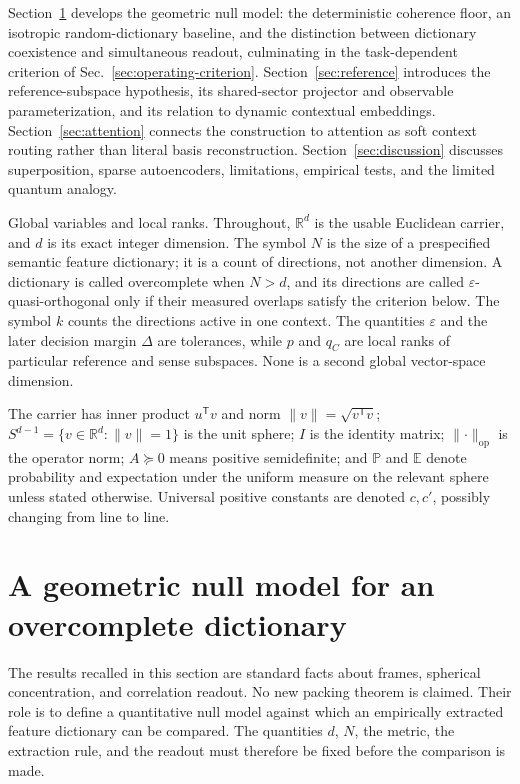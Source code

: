 \documentclass[
  aps,
  reprint,
  superscriptaddress,
  floatfix,
  nofootinbib,
  longbibliography
]{revtex4-2}
\newcommand{\R}{\mathbb{R}}
\newcommand{\E}{\mathbb{E}}
\newcommand{\Prob}{\mathbb{P}}
\newcommand{\Sph}[1]{S^{#1}}
\newcommand{\Nsem}{N}
\newcommand{\T}{^{\mathsf{T}}}
\newcommand{\opnorm}[1]{\lVert #1 \rVert_{\mathrm{op}}}
\newcommand{\norm}[1]{\lVert #1 \rVert}
\begin{document}
Section~\ref{sec:concentration} develops the geometric null model:
the deterministic coherence floor, an isotropic random-dictionary baseline,
and the distinction between dictionary coexistence and simultaneous readout,
culminating in the task-dependent criterion of
Sec.~\ref{sec:operating-criterion}. Section~\ref{sec:reference} introduces the
reference-subspace hypothesis, its shared-sector projector and observable
parameterization, and its relation to dynamic contextual embeddings.
Section~\ref{sec:attention} connects the construction to attention as soft
context routing rather than literal basis reconstruction.
Section~\ref{sec:discussion} discusses superposition, sparse
autoencoders, limitations, empirical tests, and the limited quantum
analogy.

{Global variables and local ranks.}
Throughout, $\R^{d}$ is the usable Euclidean carrier, and $d$ is its exact
integer dimension.  The symbol $\Nsem$ is the size of a prespecified semantic
feature dictionary; it is a count of directions, not another dimension.  A
dictionary is called overcomplete when $\Nsem>d$, and its directions are
called $\varepsilon$-quasi-orthogonal only if their measured overlaps satisfy
the criterion below.  The symbol $k$ counts the directions active in one
context.  The quantities $\varepsilon$ and the later decision margin $\Delta$
are tolerances, while $p$ and $q_C$ are local ranks of particular reference
and sense subspaces.  None is a second global vector-space dimension.

The carrier has inner product $u\T v$
and norm $\norm{v}=\sqrt{v\T v}$; $\Sph{d-1}=\{v\in\R^{d}:\norm{v}=1\}$
is the unit sphere; $I$ is the identity matrix; $\opnorm{\cdot}$ is the
operator norm; $A\succeq0$ means positive semidefinite; and $\Prob$ and
$\E$ denote probability and expectation under the uniform measure on
the relevant sphere unless stated otherwise. Universal positive
constants are denoted $c,c'$, possibly changing from line to line.

\section{A geometric null model for an overcomplete dictionary}
\label{sec:concentration}

The results recalled in this section are standard facts about frames,
spherical concentration, and correlation readout.  No new packing theorem is
claimed.  Their role is to define a quantitative null model against which an
empirically extracted feature dictionary can be compared.  The quantities
$d$, $\Nsem$, the metric, the extraction rule, and the readout must therefore
be fixed before the comparison is made.
\end{document}
